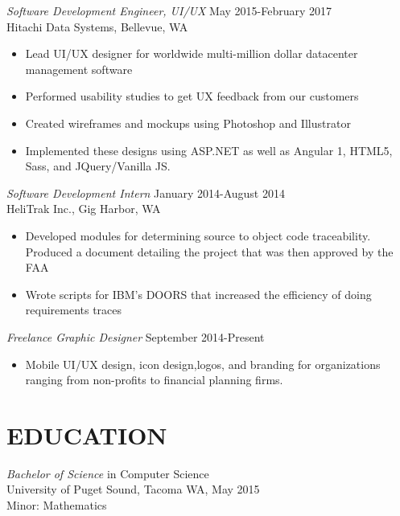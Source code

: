 \documentclass[margin]{res}
\begin{document}
\begin{resume}
 {\sl Software Development Engineer, UI/UX} \hfill May 2015-February 2017 \\ 
                Hitachi Data Systems, Bellevue, WA 
                 \begin{itemize}  \itemsep -2pt %
                 \item   Lead UI/UX designer for worldwide multi-million dollar datacenter management software
                 \item Performed usability studies to get UX feedback from our customers
                \item   Created wireframes and mockups using Photoshop and Illustrator
                \item Implemented these designs using ASP.NET as well as Angular 1, HTML5, Sass, and JQuery/Vanilla JS.
                \end{itemize}
                 {\sl Software Development Intern} \hfill January 2014-August 2014 \\ 
                HeliTrak Inc., Gig Harbor, WA
                \begin{itemize}  \itemsep -2pt %
                 \item Developed modules for determining source to object code traceability. Produced a document detailing the project that was then approved by the FAA
                 \item Wrote scripts for IBM’s DOORS that increased the efficiency of doing requirements traces
                \end{itemize}            
                
                {\sl Freelance Graphic Designer} \hfill September 2014-Present \\ 
                 \begin{itemize}  \itemsep -2pt %
                 \item   Mobile UI/UX design, icon design,logos, and branding for organizations ranging from non-profits to financial planning firms.    
                \end{itemize}    
                
\section{EDUCATION} {\sl Bachelor of Science} in Computer Science \\
                University of Puget Sound, Tacoma WA, 
                May 2015 \\
                Minor: Mathematics \\
 

\end{resume}
\end{document}
